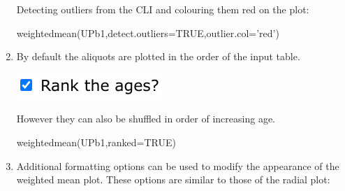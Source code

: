 \begin{refsection}
\begin{enumerate}
Detecting outliers from the CLI and colouring them red on the plot:
\begin{console}
weightedmean(UPb1,detect.outliers=TRUE,outlier.col='red')
\end{console}

\item By default the aliquots are plotted in the order of the input
  table.

\noindent\begin{minipage}[t]{.22\linewidth}
\strut\vspace*{-\baselineskip}\newline
\includegraphics[width=\linewidth]{../figures/UPbWtdMeanRank.png}
\end{minipage}
\begin{minipage}[t]{.78\linewidth}
However they can also be shuffled in order of increasing age.
\end{minipage}

\begin{console}
weightedmean(UPb1,ranked=TRUE)
\end{console}

\item Additional formatting options can be used to modify the
  appearance of the weighted mean plot. These options are similar to
  those of the radial plot:


\end{enumerate}
\end{refsection}
